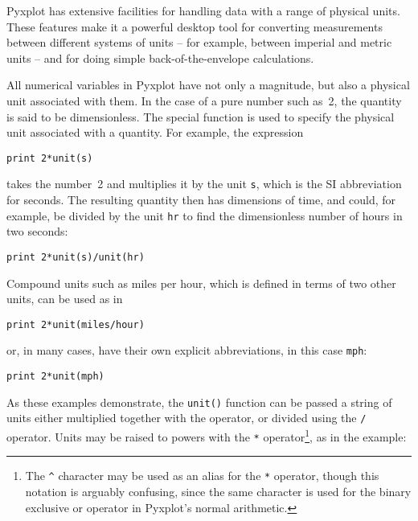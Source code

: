 Pyxplot has extensive facilities for handling data with a range of physical
units. These features make it a powerful desktop tool for converting
measurements between different systems of units -- for example, between
imperial and metric units -- and for doing simple back-of-the-envelope
calculations.

All numerical variables in Pyxplot have not only a magnitude, but also a
physical unit associated with them. In the case of a pure number such as~2, the
quantity is said to be dimensionless. The special function  is
used to specify the physical unit associated with a quantity. For example, the
expression

\begin{verbatim}
print 2*unit(s)
\end{verbatim}

\noindent takes the number~2 and multiplies it by the unit {\tt s}, which is
the SI abbreviation for seconds.  The resulting quantity then has dimensions of
time, and could, for example, be divided by the unit {\tt hr} to find the
dimensionless number of hours in two seconds:

\begin{verbatim}
print 2*unit(s)/unit(hr)
\end{verbatim}

Compound units such as miles per hour, which is defined in terms of two other
units, can be used as in

\begin{verbatim}
print 2*unit(miles/hour)
\end{verbatim}

\noindent or, in many cases, have their own explicit abbreviations, in this
case {\tt mph}:

\begin{verbatim}
print 2*unit(mph)
\end{verbatim}

\noindent As these examples demonstrate, the {\tt unit()} function can be
passed a string of units either multiplied together with the {\tt *} operator,
or divided using the {\tt /} operator. Units may be raised to powers with the
{\tt **} operator\footnote{The {\tt \^{}} character may be used as an alias for
the {\tt **} operator, though this notation is arguably confusing, since the
same character is used for the binary exclusive or operator in Pyxplot's normal
arithmetic.}, as in the example:

\vspace{3mm}

\vspace{3mm}

